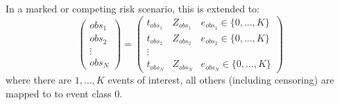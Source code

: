\documentclass[10pt]{article}
\begin{document}
In a marked or competing risk scenario, this is extended to:
\begin{equation*}
\begin{pmatrix}
obs_1 \\
obs_2 \\
\vdots \\
obs_N
\end{pmatrix}
=
\begin{pmatrix}
    t_{obs_1} & Z_{obs_1} & e_{obs_1} \in \{0, \ldots, K\} \\
    t_{obs_2} & Z_{obs_2} & e_{obs_2} \in \{0, \ldots, K\} \\
\vdots \\
    t_{obs_N} & Z_{obs_N} & e_{obs_N} \in \{0, \ldots, K\} 
\end{pmatrix}
\end{equation*}
where there are $1, \ldots, K$ events of interest, all others (including censoring) are mapped to to event class $0$.
\end{document}
